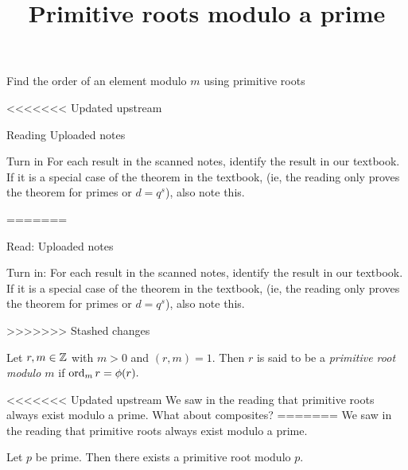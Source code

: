 \documentclass{ximera}
\title{Primitive roots modulo a prime}
\begin{document}
\begin{abstract}
\end{abstract}
\maketitle


\begin{obj}
    \item Find the order of an element modulo $m$ using primitive roots
\end{obj}

<<<<<<< Updated upstream
\begin{instructorNotes}
\begin{pre}
    \item[Reading] Uploaded notes
    \item[Turn in] For each result in the scanned notes, identify the result in our textbook. If it is a special case of the theorem in the textbook, (ie, the reading only proves the theorem for primes or $d=q^s$), also note this.

\end{pre}
    
\end{instructorNotes}
=======
\begin{pre}
    \item[Read:] Uploaded notes
    \item[Turn in:] For each result in the scanned notes, identify the result in our textbook. If it is a special case of the theorem in the textbook, (ie, the reading only proves the theorem for primes or $d=q^s$), also note this.

\end{pre}
    
>>>>>>> Stashed changes


\begin{definition}\label{defn:prime-root}
    Let $r,m\in\mathbb Z$ with $m>0$ and $(r,m)=1.$ Then $r$ is said to be a \emph{primitive root modulo $m$} if $\operatorname{ord}_m r=\phi(r).$
\end{definition}

<<<<<<< Updated upstream
We saw in the reading that primitive roots always exist modulo a prime. What about composites?
=======
We saw in the reading that primitive roots always exist modulo a prime. 
\begin{theorem}\label{thm:prime-roots}
    Let $p$ be prime. Then there exists a primitive root modulo $p.$
\end{theorem}
\end{document}
